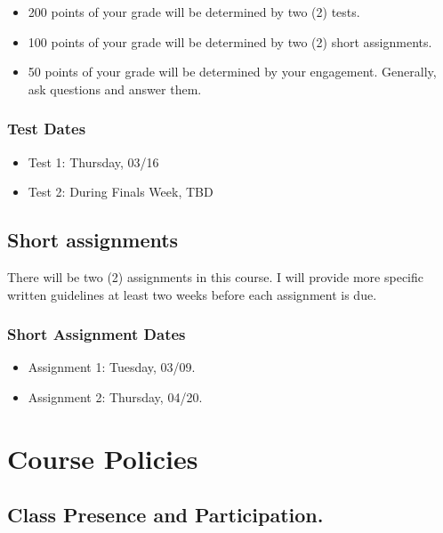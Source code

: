 \documentclass[11pt,]{article}
\providecommand{\tightlist}{%
  \setlength{\itemsep}{0pt}\setlength{\parskip}{0pt}}
\begin{document}
\begin{itemize}
\tightlist
\item
  200 points of your grade will be determined by two (2) tests.
\item
  100 points of your grade will be determined by two (2) short
  assignments.
\item
  50 points of your grade will be determined by your engagement.
  Generally, ask questions and answer them.
\end{itemize}

\hypertarget{test-dates-1}{%
\subsubsection{Test Dates}\label{test-dates-1}}

\begin{itemize}
\item
  Test 1: Thursday, 03/16
\item
  Test 2: During Finals Week, TBD
\end{itemize}

\hypertarget{short-assignments-1}{%
\subsection{Short assignments}\label{short-assignments-1}}

There will be two (2) assignments in this course. I will provide more
specific written guidelines at least two weeks before each assignment is
due.

\hypertarget{short-assignment-dates}{%
\subsubsection{Short Assignment Dates}\label{short-assignment-dates}}

\begin{itemize}
\item
  Assignment 1: Tuesday, 03/09.
\item
  Assignment 2: Thursday, 04/20.
\end{itemize}

\hypertarget{course-policies}{%
\section{Course Policies}\label{course-policies}}

\hypertarget{class-presence-and-participation.}{%
\subsection{Class Presence and
Participation.}\label{class-presence-and-participation.}}
\end{document}
